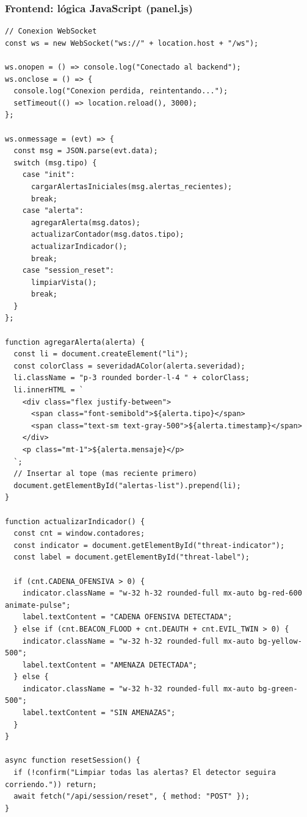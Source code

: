 \documentclass[11pt,a4paper]{article}
\begin{document}
\subsubsection{Frontend: lógica JavaScript (panel.js)}

\begin{lstlisting}
// Conexion WebSocket
const ws = new WebSocket("ws://" + location.host + "/ws");

ws.onopen = () => console.log("Conectado al backend");
ws.onclose = () => {
  console.log("Conexion perdida, reintentando...");
  setTimeout(() => location.reload(), 3000);
};

ws.onmessage = (evt) => {
  const msg = JSON.parse(evt.data);
  switch (msg.tipo) {
    case "init":
      cargarAlertasIniciales(msg.alertas_recientes);
      break;
    case "alerta":
      agregarAlerta(msg.datos);
      actualizarContador(msg.datos.tipo);
      actualizarIndicador();
      break;
    case "session_reset":
      limpiarVista();
      break;
  }
};

function agregarAlerta(alerta) {
  const li = document.createElement("li");
  const colorClass = severidadAColor(alerta.severidad);
  li.className = "p-3 rounded border-l-4 " + colorClass;
  li.innerHTML = `
    <div class="flex justify-between">
      <span class="font-semibold">${alerta.tipo}</span>
      <span class="text-sm text-gray-500">${alerta.timestamp}</span>
    </div>
    <p class="mt-1">${alerta.mensaje}</p>
  `;
  // Insertar al tope (mas reciente primero)
  document.getElementById("alertas-list").prepend(li);
}

function actualizarIndicador() {
  const cnt = window.contadores;
  const indicator = document.getElementById("threat-indicator");
  const label = document.getElementById("threat-label");

  if (cnt.CADENA_OFENSIVA > 0) {
    indicator.className = "w-32 h-32 rounded-full mx-auto bg-red-600 animate-pulse";
    label.textContent = "CADENA OFENSIVA DETECTADA";
  } else if (cnt.BEACON_FLOOD + cnt.DEAUTH + cnt.EVIL_TWIN > 0) {
    indicator.className = "w-32 h-32 rounded-full mx-auto bg-yellow-500";
    label.textContent = "AMENAZA DETECTADA";
  } else {
    indicator.className = "w-32 h-32 rounded-full mx-auto bg-green-500";
    label.textContent = "SIN AMENAZAS";
  }
}

async function resetSession() {
  if (!confirm("Limpiar todas las alertas? El detector seguira corriendo.")) return;
  await fetch("/api/session/reset", { method: "POST" });
}
\end{lstlisting}
\end{document}
